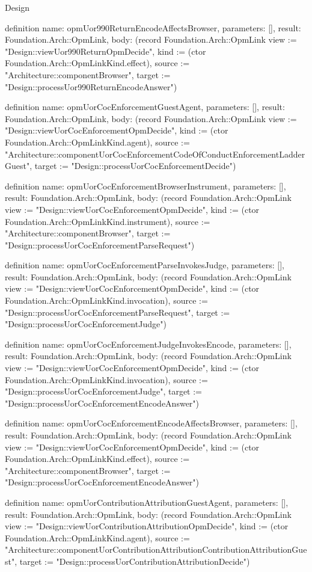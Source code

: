 \begin{lexlean}{Design}
\begin{semanticmodule}
definition{
  name: opmUor990ReturnEncodeAffectsBrowser,
  parameters: [],
  result: Foundation.Arch::OpmLink,
  body: (record Foundation.Arch::OpmLink {view := "Design::viewUor990ReturnOpmDecide", kind := (ctor Foundation.Arch::OpmLinkKind.effect), source := "Architecture::componentBrowser", target := "Design::processUor990ReturnEncodeAnswer"})
}

definition{
  name: opmUorCocEnforcementGuestAgent,
  parameters: [],
  result: Foundation.Arch::OpmLink,
  body: (record Foundation.Arch::OpmLink {view := "Design::viewUorCocEnforcementOpmDecide", kind := (ctor Foundation.Arch::OpmLinkKind.agent), source := "Architecture::componentUorCocEnforcementCodeOfConductEnforcementLadderGuest", target := "Design::processUorCocEnforcementDecide"})
}

definition{
  name: opmUorCocEnforcementBrowserInstrument,
  parameters: [],
  result: Foundation.Arch::OpmLink,
  body: (record Foundation.Arch::OpmLink {view := "Design::viewUorCocEnforcementOpmDecide", kind := (ctor Foundation.Arch::OpmLinkKind.instrument), source := "Architecture::componentBrowser", target := "Design::processUorCocEnforcementParseRequest"})
}

definition{
  name: opmUorCocEnforcementParseInvokesJudge,
  parameters: [],
  result: Foundation.Arch::OpmLink,
  body: (record Foundation.Arch::OpmLink {view := "Design::viewUorCocEnforcementOpmDecide", kind := (ctor Foundation.Arch::OpmLinkKind.invocation), source := "Design::processUorCocEnforcementParseRequest", target := "Design::processUorCocEnforcementJudge"})
}

definition{
  name: opmUorCocEnforcementJudgeInvokesEncode,
  parameters: [],
  result: Foundation.Arch::OpmLink,
  body: (record Foundation.Arch::OpmLink {view := "Design::viewUorCocEnforcementOpmDecide", kind := (ctor Foundation.Arch::OpmLinkKind.invocation), source := "Design::processUorCocEnforcementJudge", target := "Design::processUorCocEnforcementEncodeAnswer"})
}

definition{
  name: opmUorCocEnforcementEncodeAffectsBrowser,
  parameters: [],
  result: Foundation.Arch::OpmLink,
  body: (record Foundation.Arch::OpmLink {view := "Design::viewUorCocEnforcementOpmDecide", kind := (ctor Foundation.Arch::OpmLinkKind.effect), source := "Architecture::componentBrowser", target := "Design::processUorCocEnforcementEncodeAnswer"})
}

definition{
  name: opmUorContributionAttributionGuestAgent,
  parameters: [],
  result: Foundation.Arch::OpmLink,
  body: (record Foundation.Arch::OpmLink {view := "Design::viewUorContributionAttributionOpmDecide", kind := (ctor Foundation.Arch::OpmLinkKind.agent), source := "Architecture::componentUorContributionAttributionContributionAttributionGuest", target := "Design::processUorContributionAttributionDecide"})
}


\end{semanticmodule}
\end{lexlean}
